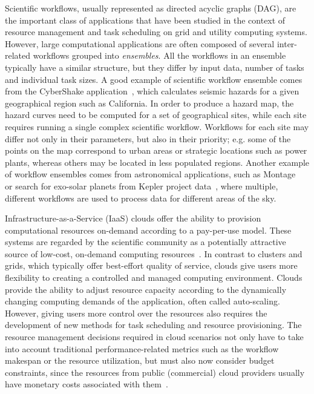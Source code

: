 \documentclass{sig-alternate}
\begin{document}
Scientific workflows, usually represented as directed acyclic graphs (DAG), are
the important class of applications that have been studied in the context of
resource management and task scheduling on grid and utility computing systems.
However, large computational applications are often composed of several 
inter-related workflows grouped into {\em ensembles}. All the
workflows in an ensemble typically have a similar structure, but they differ by
input data, number of tasks and individual task sizes. A good example of
scientific workflow ensemble comes from the CyberShake
application~\cite{Callaghan11}, which calculates seismic hazards for a given
geographical region such as California. In order to produce a hazard map, the
hazard curves need to be computed for a set of geographical sites, while each
site requires running a single complex scientific workflow. Workflows for each
site may differ not only in their parameters, but also in their priority; e.g. some of
the points on the map correspond to urban areas or strategic locations such as
power plants, whereas others may be located in less populated regions. Another
example of workflow ensembles comes from astronomical applications, such as
Montage~\cite{Deelman08} or search for exo-solar planets from Kepler project
data~\cite{vockler11}, where multiple, different workflows are used to
process data for different areas of the sky.

Infrastructure-as-a-Service (IaaS) clouds offer the ability to provision 
computational resources on-demand according to a pay-per-use model. These systems 
are regarded by the scientific community as a potentially attractive source of 
low-cost, on-demand computing resources~\cite{Ostermann10,Keahey09}. In contrast 
to clusters and grids, which typically offer best-effort quality of service, clouds 
give users more flexibility to creating a controlled and managed computing environment.
Clouds provide the ability to adjust resource capacity according to the dynamically changing
computing demands of the application, often called auto-scaling. However, giving users 
more control over the resources also requires the development of new methods for task 
scheduling and resource provisioning. The resource management decisions required 
in cloud scenarios not only have to take into account traditional performance-related 
metrics such as the workflow makespan or the resource utilization, but must also now consider
budget constraints, since the resources from public (commercial) cloud providers 
usually have monetary costs associated with them~\cite{Durkee10}.
\end{document}
